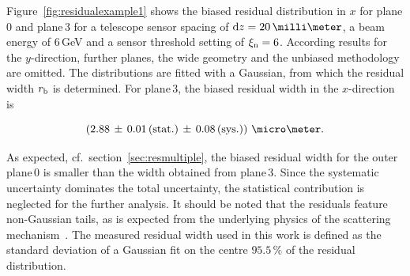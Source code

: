 

Figure~\ref{fig:residualexample1} shows the biased residual distribution in $x$ for plane\,0 and plane\,3 for a telescope sensor spacing of $\dz = 20\,\milli\meter$,
 a beam energy of 6\,GeV and a sensor threshold setting of $\xi_{\textrm{n}} = 6$. 
According results for the $y$-direction, further planes, the wide geometry and the unbiased methodology are omitted. 
The distributions are fitted with a Gaussian, from which the residual width $r_{\textrm{b}}$ is determined. 
For plane\,3, the biased residual width in the $x$-direction is 

\begin{equation}
\left( 2.88\,\pm\, 0.01\,\textrm{(stat.)}\,\pm\, 0.08\, \textrm{(sys.)}\right)\,\micro\meter.
\end{equation}

\noindent
As expected, cf.\ section~\ref{sec:resmultiple}, the biased residual width for the outer plane\,0 is smaller than the width obtained from plane\,3.
Since the systematic uncertainty dominates the total uncertainty, the statistical contribution is neglected for the further analysis. 
It should be noted that the residuals feature non-Gaussian tails, as is expected from the underlying physics of the scattering mechanism~\cite{ref:PDG-2014}. 
The measured residual width used in this work is defined as the standard deviation of a Gaussian fit on the centre $95.5\,\%$ of the residual distribution.

% 

